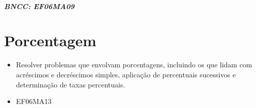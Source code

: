 \paragraph{BNCC: EF06MA09 }


\chapter{Porcentagem}

\begin{itemize}
\item Resolver problemas que envolvam porcentagens,
incluindo os que lidam com acréscimos e decréscimos simples, aplicação
de percentuais sucessivos e determinação de taxas percentuais.
\end{itemize}

\begin{itemize}
\item EF06MA13
\end{itemize}

